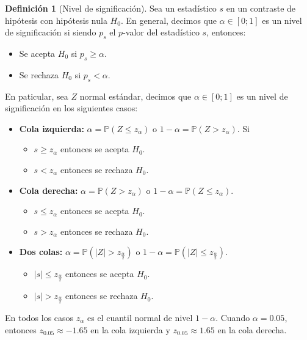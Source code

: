 \documentclass[11pt,a4paper]{book}
\theoremstyle{definition}%
\newtheorem{definicion}[teorema]{Definici\'on}
\newcommand{\Prob}[1]{\mathds{P}\left( #1 \right)}
\begin{document}
            \begin{definicion}[Nivel de significación]
                Sea un estadístico $s$ en un contraste de hipótesis con hipótesis nula $H_0$. En general, decimos que $\alpha\in [0;1]$ es un nivel de significación si siendo $p_s$ el $p$-valor del estadístico $s$, entonces:
                \begin{itemize}
                    \item Se acepta $H_0$ si $p_s\geq\alpha$.
                    \item Se rechaza $H_0$ si $p_s<\alpha$.
                \end{itemize}
                
                En paticular, sea $Z$ normal estándar, decimos que $\alpha\in [0;1]$ es un nivel de significación en los siguientes casos:
                \begin{itemize}
                    \item \textbf{Cola izquierda:} $\alpha=\Prob{Z \leq z_{\alpha}}$ o $1-\alpha=\Prob{Z > z_{\alpha}}$. Si 
                            \begin{itemize}
                                \item $s\geq z_{\alpha}$ entonces se acepta $H_0$.
                                \item $s<z_{\alpha}$ entonces se rechaza $H_0$.
                            \end{itemize}
                    \item \textbf{Cola derecha:} $\alpha=\Prob{Z > z_{\alpha}}$ o $1-\alpha=\Prob{Z \leq z_{\alpha}}$.
                            \begin{itemize}
                                \item $s\leq z_{\alpha}$ entonces se acepta $H_0$.
                                \item $s>z_{\alpha}$ entonces se rechaza $H_0$.
                            \end{itemize}
                    \item \textbf{Dos colas:} $\alpha=\Prob{|Z| > z_{\frac{\alpha}{2}}}$ o $1-\alpha=\Prob{|Z| \leq z_{\frac{\alpha}{2}}}$.
                            \begin{itemize}
                                \item $|s|\leq z_{\frac{\alpha}{2}}$ entonces se acepta $H_0$.
                                \item $|s|>z_{\frac{\alpha}{2}}$ entonces se rechaza $H_0$.
                            \end{itemize}
                \end{itemize}
                En todos los casos $z_{\alpha}$ es el cuantil normal de nivel $1-\alpha$. Cuando $\alpha=0.05$, entonces $z_{0.05}\approx-1.65$ en la cola izquierda y $z_{0.05}\approx1.65$ en la cola derecha.
            \end{definicion}
\end{document}
